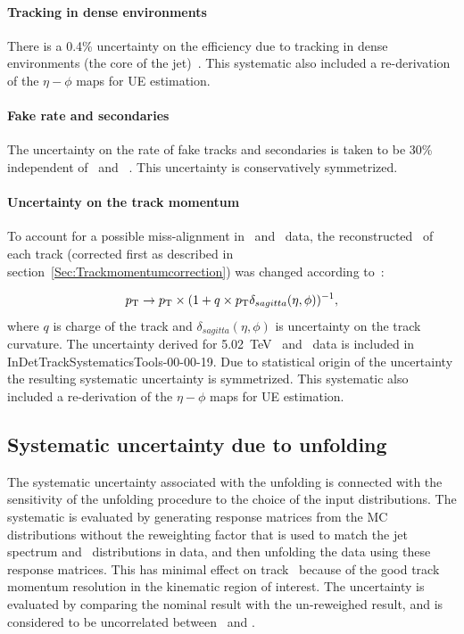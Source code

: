 \paragraph{Tracking in dense environments}
There is a 0.4\% uncertainty on the efficiency due to tracking in dense environments (the core of the jet)~\cite{ref:tracktwiki}. This systematic also included a re-derivation of the $\eta-\phi$ maps for UE estimation.


\paragraph{Fake rate and secondaries}
The uncertainty on the rate of fake tracks and secondaries is taken to be 30\% independent of \pttrk\ and \etatrk~\cite{ref:tracktwiki, Nachman:2259091}. This uncertainty is conservatively symmetrized.

\paragraph{Uncertainty on the track momentum}
To account for a possible miss-alignment in \pp\ and \PbPb\ data, the reconstructed \pT\ of each track (corrected first as described in section~\ref{Sec:Trackmomentumcorrection}) was changed according to~\cite{TrackingRec}:

\begin{equation}
\mbox{$p_{\mathrm{T}}$} \rightarrow \mbox{$p_{\mathrm{T}}$} \times (1 + q \times \mbox{$p_{\mathrm{T}}$} \delta_{sagitta}(\eta, \phi))^{-1},
\end{equation}
where $q$ is charge of the track and $\delta_{sagitta}(\eta, \phi)$ is uncertainty on the track curvature. The uncertainty derived for 5.02~TeV \pp\ and \PbPb\ data is included in InDetTrackSystematicsTools-00-00-19. Due to statistical origin of the uncertainty the resulting systematic uncertainty is symmetrized. This systematic also included a re-derivation of the $\eta-\phi$ maps for UE estimation.


\subsection{Systematic uncertainty due to unfolding}
The systematic uncertainty associated with the unfolding is connected with the sensitivity of the unfolding procedure to the choice of the input distributions. The systematic is evaluated by generating response matrices from the MC distributions without the reweighting factor that is used to match the jet spectrum and \Dptr\ distributions in data, and then unfolding the data using these response matrices. This has minimal effect on track \pt\ because of the good track momentum resolution in the kinematic region of interest. The uncertainty is evaluated by comparing the nominal result with the un-reweighed result, and is considered to be uncorrelated between \pbpb\ and \pp.


